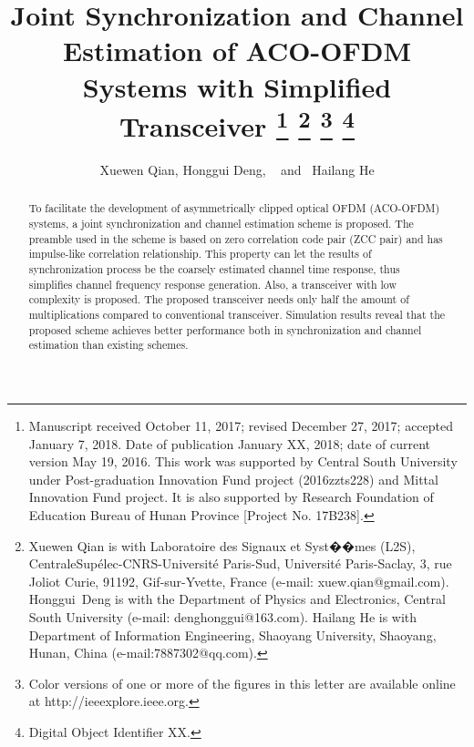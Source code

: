 \documentclass[10pt,journal]{IEEEtran}
\begin{document}



\title{ {Joint Synchronization and Channel Estimation of ACO-OFDM Systems with Simplified Transceiver}
\thanks{
Manuscript received October 11, 2017; revised December 27, 2017; accepted January 7, 2018. Date of publication January XX, 2018; date of current version May 19, 2016. This work was supported by Central South University under Post-graduation Innovation Fund project (2016zzts228) and Mittal Innovation Fund project. It is also supported by Research Foundation of Education Bureau of Hunan Province [Project No. 17B238].
}
\thanks{
Xuewen Qian is with Laboratoire des Signaux et Syst��mes (L2S), CentraleSup\'elec-CNRS-Universit\'e Paris-Sud, Universit\'e Paris-Saclay, 3, rue Joliot Curie, 91192, Gif-sur-Yvette, France (e-mail: xuew.qian@gmail.com).
Honggui~Deng is with the Department of Physics and Electronics, Central South University (e-mail: denghonggui@163.com).
Hailang He is with Department of Information Engineering, Shaoyang University, Shaoyang, Hunan, China (e-mail:7887302@qq.com).
}
\thanks{
Color versions of one or more of the figures in this letter are available online at http://ieeexplore.ieee.org.
}
\thanks{
Digital Object Identifier XX.
}
}

\author{Xuewen Qian,
        Honggui Deng, ~
        and~ Hailang He }



\maketitle
\begin{abstract}
To facilitate the development of asymmetrically clipped optical OFDM (ACO-OFDM) systems, a joint synchronization and channel estimation scheme is proposed. The preamble used in the scheme is based on zero correlation code pair (ZCC pair) and has impulse-like correlation relationship. This property can let the results of synchronization process be the coarsely estimated channel time response, thus simplifies channel frequency response generation. Also, a transceiver with low complexity is proposed. The proposed transceiver needs only half the amount of multiplications compared to conventional transceiver. Simulation results reveal that the proposed scheme achieves better performance both in synchronization and channel estimation than existing schemes.
\end{abstract}
\end{document}
